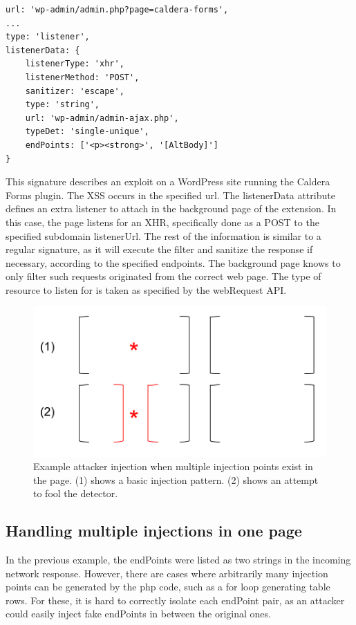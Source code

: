  \lstset{basicstyle=\small}
\begin{lstlisting}
url: 'wp-admin/admin.php?page=caldera-forms',
...
type: 'listener',
listenerData: {
	listenerType: 'xhr',
	listenerMethod: 'POST',
	sanitizer: 'escape',
	type: 'string',
	url: 'wp-admin/admin-ajax.php',
	typeDet: 'single-unique',
	endPoints: ['<p><strong>', '[AltBody]']
}
\end{lstlisting}

This signature describes an exploit on a WordPress site running the Caldera Forms plugin. The XSS occurs in the specified url. The listenerData attribute defines an extra listener to attach in the background page of the extension. In this case, the page listens for an XHR, specifically done as a POST to the specified subdomain listenerUrl. The rest of the information is similar to a regular signature, as it will execute the filter and sanitize the response if necessary, according to the specified endpoints. The background page knows to only filter such requests originated from the correct web page. The type of resource to listen for is taken as specified by the webRequest API. 

\begin{figure}[h]
	\includegraphics[scale=0.5]{img/attacker_injection_compound.png}
	\caption{Example attacker injection when multiple injection points exist in the page. (1) shows a basic injection pattern. (2) shows an attempt to fool the detector.}
	\label{fig:attacker_injection}
\end{figure}

\subsection{Handling multiple injections in one page}
In the previous example, the endPoints were listed as two strings in the incoming network response. However, there are cases where arbitrarily many injection points can be generated by the php code, such as a for loop generating table rows. For these, it is hard to correctly isolate each endPoint pair, as an attacker could easily inject fake endPoints in between the original ones.

